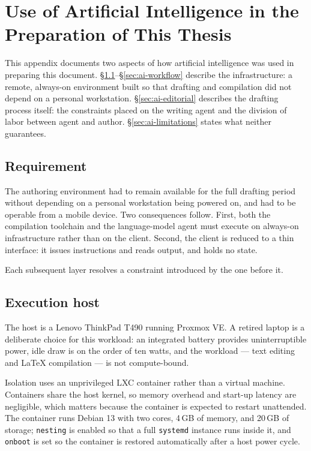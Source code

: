 \chapter{Use of Artificial Intelligence in the Preparation of This Thesis}
\label{ch:ai-appendix}

This appendix documents two aspects of how artificial intelligence was used in preparing this document. \S\ref{sec:ai-requirement}--\S\ref{sec:ai-workflow} describe the infrastructure: a remote, always-on environment built so that drafting and compilation did not depend on a personal workstation. \S\ref{sec:ai-editorial} describes the drafting process itself: the constraints placed on the writing agent and the division of labor between agent and author. \S\ref{sec:ai-limitations} states what neither guarantees.

\section{Requirement}
\label{sec:ai-requirement}

The authoring environment had to remain available for the full drafting period without depending on a personal workstation being powered on, and had to be operable from a mobile device. Two consequences follow. First, both the compilation toolchain and the language-model agent must execute on always-on infrastructure rather than on the client. Second, the client is reduced to a thin interface: it issues instructions and reads output, and holds no state.

Each subsequent layer resolves a constraint introduced by the one before it.

\section{Execution host}
\label{sec:ai-host}

The host is a Lenovo ThinkPad T490 running Proxmox VE. A retired laptop is a deliberate choice for this workload: an integrated battery provides uninterruptible power, idle draw is on the order of ten watts, and the workload --- text editing and \LaTeX{} compilation --- is not compute-bound.

Isolation uses an unprivileged LXC container rather than a virtual machine. Containers share the host kernel, so memory overhead and start-up latency are negligible, which matters because the container is expected to restart unattended. The container runs Debian 13 with two cores, 4\,GB of memory, and 20\,GB of storage; \texttt{nesting} is enabled so that a full \texttt{systemd} instance runs inside it, and \texttt{onboot} is set so the container is restored automatically after a host power cycle.

